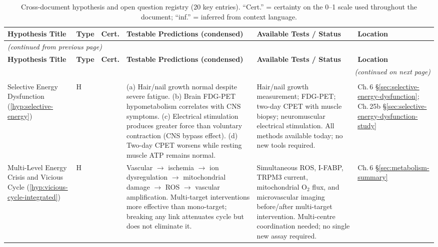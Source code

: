 \begin{longtable}{%
  p{3.0cm}
  >{\centering\arraybackslash}p{0.55cm}
  >{\centering\arraybackslash}p{1.0cm}
  p{3.8cm}
  p{3.8cm}
  p{2.2cm}
}

\caption{Cross-document hypothesis and open question registry (20 key entries).
  ``Cert.'' = certainty on the 0--1 scale used throughout the document;
  ``inf.'' = inferred from context language.
  \label{tab:hypothesis-registry}}\\

\toprule
\textbf{Hypothesis Title} &
\textbf{Type} &
\textbf{Cert.} &
\textbf{Testable Predictions (condensed)} &
\textbf{Available Tests / Status} &
\textbf{Location} \\
\midrule
\endfirsthead

\multicolumn{6}{l}{\footnotesize\textit{(continued from previous page)}}\\
\toprule
\textbf{Hypothesis Title} &
\textbf{Type} &
\textbf{Cert.} &
\textbf{Testable Predictions (condensed)} &
\textbf{Available Tests / Status} &
\textbf{Location} \\
\midrule
\endhead

\midrule
\multicolumn{6}{r}{\footnotesize\textit{(continued on next page)}}\\
\endfoot

\bottomrule
\endlastfoot

\multicolumn{6}{l}{\small\textit{\textbf{Domain 1: Energy Metabolism}}} \\[2pt]

Selective Energy Dysfunction
(\ref{hyp:selective-energy})
&
H & 0.55
&
(a) Hair/nail growth normal despite severe fatigue.
(b) Brain FDG-PET hypometabolism correlates with CNS symptoms.
(c) Electrical stimulation produces greater force than voluntary contraction
(CNS bypass effect).
(d) Two-day CPET worsens while resting muscle ATP remains normal.
&
Hair/nail growth measurement; FDG-PET; two-day CPET with muscle biopsy;
neuromuscular electrical stimulation.
All methods available today; no new tools required.
&
Ch.\,6 \S\ref{sec:selective-energy-dysfunction};
Ch.\,25b \S\ref{sec:selective-energy-dysfunction-study} \\[6pt]

Multi-Level Energy Crisis and Vicious Cycle
(\ref{hyp:vicious-cycle-integrated})
&
H & 0.55
&
Vascular $\to$ ischemia $\to$ ion dysregulation $\to$ mitochondrial damage
$\to$ ROS $\to$ vascular amplification.
Multi-target interventions more effective than mono-target; breaking any link
attenuates cycle but does not eliminate it.
&
Simultaneous ROS, I-FABP, TRPM3 current, mitochondrial O$_2$ flux, and
microvascular imaging before/after multi-target intervention.
Multi-centre coordination needed; no single new assay required.
&
Ch.\,6 \S\ref{sec:metabolism-summary} \\[6pt]


\end{longtable}
